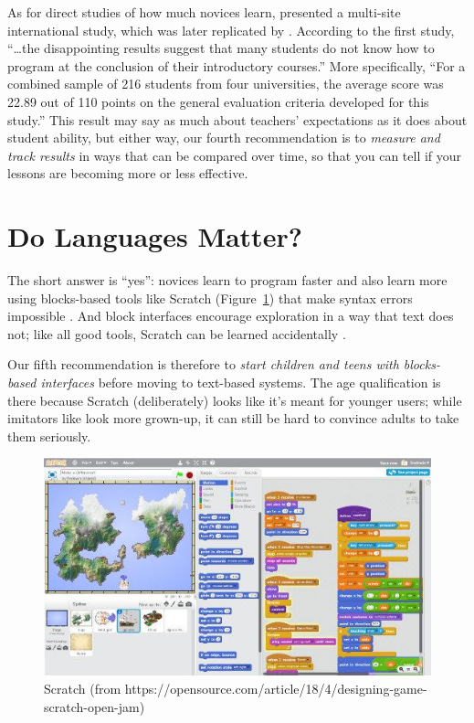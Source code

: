 As for direct studies of how much novices learn, \cite{McCr2001}
presented a multi-site international study, which was later replicated
by \cite{Utti2013}. According to the first study, ``{\ldots}the
disappointing results suggest that many students do not know how to
program at the conclusion of their introductory courses.'' More
specifically, ``For a combined sample of 216 students from four
universities, the average score was 22.89 out of 110 points on the
general evaluation criteria developed for this study.'' This result may
say as much about teachers' expectations as it does about student
ability, but either way, our fourth recommendation is to \emph{measure and
track results} in ways that can be compared over time, so that you can
tell if your lessons are becoming more or less effective.

\section{Do Languages Matter?}\label{s:pck-language}

The short answer is ``yes'': novices learn to program faster and also
learn more using blocks-based tools like Scratch
(Figure~\ref{f:pck-scratch}) that make syntax errors impossible
\cite{Wein2017b}. And block interfaces encourage exploration in a way
that text does not; like all good tools, Scratch can be learned
accidentally \cite{Malo2010}.

Our fifth recommendation is therefore to \emph{start children and teens
with blocks-based interfaces} before moving to text-based systems. The
age qualification is there because Scratch (deliberately) looks like
it's meant for younger users; while imitators like 
look more grown-up, it can still be hard to convince adults to take
them seriously.

\begin{figure}
\centering
\includegraphics{../../figures/scratch.jpg}
\caption{Scratch (from https://opensource.com/article/18/4/designing-game-scratch-open-jam)}
\label{f:pck-scratch}
\end{figure}

